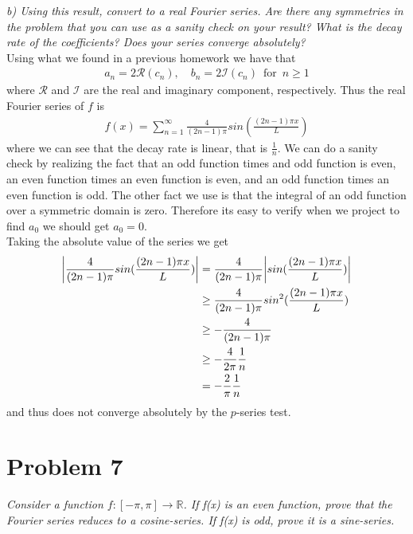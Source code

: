 \documentclass[12pt]{article}
\newcommand{\R}{\mathbb{R}}
\DeclarePairedDelimiter \babs{\bigg\lvert}{\bigg\rvert}%
\theoremstyle{remark}
\begin{document}
\newpage

\textit{b) Using this result, convert to a real Fourier series. Are there any symmetries in the problem that you can use as a sanity check on your result? What is the decay rate of the coefficients? Does your series converge absolutely?} \\

Using what we found in a previous homework we have that 
\begin{align*}
	a_n = 2\mathcal{R}(c_n), \quad b_n = 2\mathcal{I}(c_n) \, \text{ for } \, n \geq 1
\end{align*}
where $\mathcal{R}$ and $\mathcal{I}$ are the real and imaginary component, respectively. Thus the real Fourier series of $f$ is
\begin{align*}
	f(x) = \sum\limits_{n=1}^\infty \frac{4}{(2n-1)\pi}sin(\frac{(2n-1)\pi x}{L})
\end{align*}
where we can see that the decay rate is linear, that is $\frac{1}{n}$. We can do a sanity check by realizing the fact that an odd function times and odd function is even, an even function times an even function is even, and an odd function times an even function is odd. The other fact we use is that the integral of an odd function over a symmetric domain is zero. Therefore its easy to verify when we project to find $a_0$ we should get $a_0 = 0$. \\

Taking the absolute value of the series we get
\begin{align*}
\babs{ \frac{4}{(2n-1)\pi}sin(\frac{(2n-1)\pi x}{L})} & = \frac{4}{(2n-1)\pi}\babs{sin(\frac{(2n-1)\pi x}{L})} \\
& \geq \frac{4}{(2n-1)\pi}sin^2(\frac{(2n-1)\pi x}{L}) \\
& \geq -\frac{4}{(2n-1)\pi} \\
& \geq -\frac{4}{2\pi}\frac{1}{n} \\
& = -\frac{2}{\pi}\frac{1}{n}
\end{align*}
and thus does not converge absolutely by the $p$-series test.

\newpage

\section*{Problem 7}

\textit{Consider a function $f: [-\pi, \pi] \rightarrow \R$. If f(x) is an even function, prove that the Fourier series reduces to a cosine-series. If f(x) is odd, prove it is a sine-series.} \\
\end{document}

